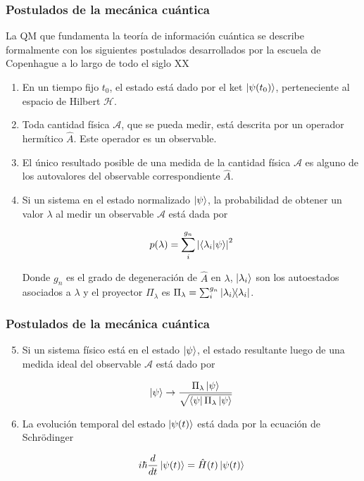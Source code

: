 \documentclass[xetex,mathserif,serif, 8pt]{beamer}
\begin{document}
\begin{frame}
    \frametitle{Postulados de la mecánica cuántica}

    La QM que fundamenta la teoría de información cuántica se describe formalmente con los siguientes postulados desarrollados por la escuela de Copenhague a lo largo de todo el siglo XX \cite{Cohen_1977}

    \begin{enumerate}
        \item En un tiempo fijo $t_0$, el estado está dado por el ket $\ket{\psi(t_0)}$, perteneciente al espacio de Hilbert $\mathcal{H}$.
        \item Toda cantidad física $\mathcal{A}$, que se pueda medir, está descrita por un operador hermítico $\hat{A}$. Este operador es un observable.
        \item El único resultado posible de una medida de la cantidad física $\mathcal{A}$ es alguno de los autovalores del observable correspondiente $\hat{A}$.
        \item Si un sistema en el estado normalizado $\ket{\psi}$, la probabilidad de obtener un valor $\lambda$ al medir un observable $\mathcal{A}$ está dada por 
            
            \begin{equation}
                p(\lambda) = \sum\limits_i^{g_n} \abs{\braket{\lambda_i}{\psi}}^2
            \end{equation}

            Donde $g_n$ es el grado de degeneración de $\hat{A}$ en $\lambda$, $\ket{\lambda_i}$ son los autoestados asociados a $\lambda$ y el proyector $\Pi_\lambda$ es $\Pi_\lambda = \sum_i^{g_n} \ketbra{\lambda_i}$.
    \end{enumerate}
\end{frame}

\begin{frame}
    \frametitle{Postulados de la mecánica cuántica}

    \begin{enumerate}
        \setcounter{enumi}{4}
        \item Si un sistema físico está en el estado $\ket{\psi}$, el estado resultante luego de una medida ideal del observable $\mathcal{A}$ está dado por

            \begin{equation}
                \ket{\psi} \rightarrow \frac{\Pi_\lambda \ket{\psi}}{\sqrt{\bra{\psi} \Pi_\lambda \ket{\psi}}}
            \end{equation}

        \item La evolución temporal del estado $\ket{\psi(t)}$  está dada por la ecuación de Schrödinger

            \begin{equation}
                i \hbar \frac{d}{dt} \ket{\psi(t)} = \hat{H}(t) \ket{\psi(t)}
            \end{equation}

    \end{enumerate}
\end{frame}
\end{document}
